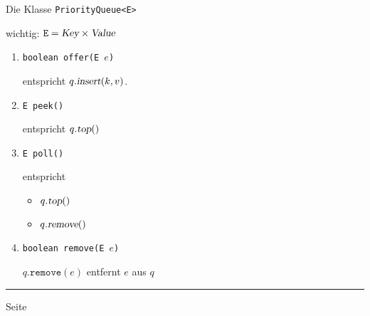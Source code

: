 \documentclass{slides}
\newcounter{mypage}
\begin{document}

\begin{slide}{}
\normalsize

\begin{center}
Die Klasse \texttt{PriorityQueue<E>}
\end{center}
\vspace*{0.5cm}

\footnotesize
wichtig: $\texttt{E} = \textsl{Key} \times \textsl{Value}$
\begin{enumerate}
\item \texttt{boolean offer(E $e$)}

      entspricht  $q.\textsl{insert}(k,v)$. 
\item \texttt{E peek()}

      entspricht $q.\textsl{top}()$
\item \texttt{E poll()}

      entspricht 
      \begin{itemize}
      \item $q.\textsl{top}()$
      \item $q.\textsl{remove}()$
      \end{itemize}
\item \texttt{boolean remove(E $e$)}

      $q.\mathtt{remove}(e)$ entfernt $e$ aus $q$
\end{enumerate}


\vspace*{\fill}
\tiny \addtocounter{mypage}{1}
\rule{17cm}{1mm}
 \hspace*{\fill} Seite 
\end{slide}

\end{document}

